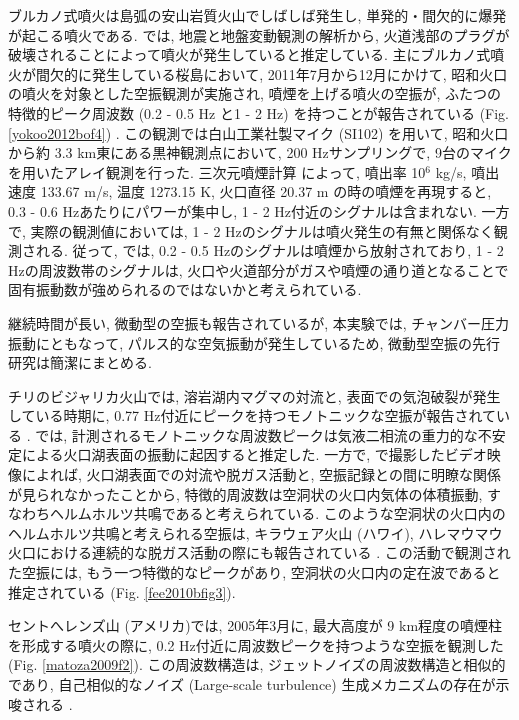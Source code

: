 \documentclass[12pt]{article}
\begin{document}
ブルカノ式噴火は島弧の安山岩質火山でしばしば発生し, 単発的・間欠的に爆発が起こる噴火である. \cite{Iguchi2008}では, 地震と地盤変動観測の解析から, 火道浅部のプラグが破壊されることによって噴火が発生していると推定している.
主にブルカノ式噴火が間欠的に発生している桜島において, 2011年7月から12月にかけて, 昭和火口の噴火を対象とした空振観測が実施され, 噴煙を上げる噴火の空振が, ふたつの特徴的ピーク周波数 (0.2 - 0.5 Hz と1 - 2 Hz) を持つことが報告されている (Fig. \ref{yokoo2012bof4}) \citep{yokoo2012bo}. この観測では白山工業社製マイク (SI102) を用いて, 昭和火口から約 3.3 km東にある黒神観測点において, 200 Hzサンプリングで, 9台のマイクを用いたアレイ観測を行った.
三次元噴煙計算 \citep{Suzuki2005} によって, 噴出率 10$^6$ kg/s, 噴出速度 133.67 m/s, 温度 1273.15 K, 火口直径 20.37 m の時の噴煙を再現すると, 0.3 - 0.6 Hzあたりにパワーが集中し, 1 - 2 Hz付近のシグナルは含まれない. 
一方で, 実際の観測値においては, 1 - 2 Hzのシグナルは噴火発生の有無と関係なく観測される. 従って, \cite{yokoo2012bo} では, 0.2 - 0.5 Hzのシグナルは噴煙から放射されており, 1 - 2 Hzの周波数帯のシグナルは, 火口や火道部分がガスや噴煙の通り道となることで固有振動数が強められるのではないかと考えられている. 




継続時間が長い, 微動型の空振も報告されているが, 本実験では, チャンバー圧力振動にともなって, パルス的な空気振動が発生しているため, 微動型空振の先行研究は簡潔にまとめる. 

チリのビジャリカ火山では, 溶岩湖内マグマの対流と, 表面での気泡破裂が発生している時期に, 0.77 Hz付近にピークを持つモノトニックな空振が報告されている \citep{Ripepe2010b, Goto2011}. 
\cite{Ripepe2010b}では, 計測されるモノトニックな周波数ピークは気液二相流の重力的な不安定による火口湖表面の振動に起因すると推定した. %
一方で, \cite{Goto2011}で撮影したビデオ映像によれば, 火口湖表面での対流や脱ガス活動と, 空振記録との間に明瞭な関係が見られなかったことから, 特徴的周波数は空洞状の火口内気体の体積振動, すなわちヘルムホルツ共鳴であると考えられている. %
このような空洞状の火口内のヘルムホルツ共鳴と考えられる空振は, キラウェア火山 (ハワイ), ハレマウマウ火口における連続的な脱ガス活動の際にも報告されている \cite{Fee2010c}. 
この活動で観測された空振には, もう一つ特徴的なピークがあり, 空洞状の火口内の定在波であると推定されている (Fig. \ref{fee2010bfig3}). 

セントへレンズ山 (アメリカ)では, 2005年3月に, 最大高度が 9 km程度の噴煙柱を形成する噴火の際に, 0.2 Hz付近に周波数ピークを持つような空振を観測した (Fig. \ref{matoza2009f2}). 
この周波数構造は, ジェットノイズの周波数構造と相似的であり, 自己相似的なノイズ (Large-scale turbulence) 生成メカニズムの存在が示唆される \citep{Matoza2009a}.
\end{document}
